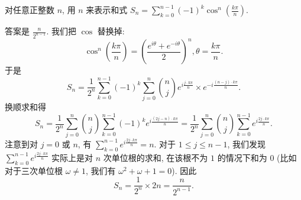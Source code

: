 \begin{prob}
\label{prob:prob-3}
对任意正整数 $n$, 用 $n$ 来表示和式
$S_n = \sum_{k=0}^{n-1}(-1)^k\cos^n(\frac{k\pi}{n})$.
\end{prob}

\begin{soln}
答案是 $\boxed{\tfrac{n}{2^{n-1}}.}$
我们把 $\cos$ 替换掉:
\[
\cos^n\left(\frac{k\pi}{n}\right) =
\left(\frac{e^{i\theta} + e^{-i\theta}}{2}\right)^n,
\theta = \frac{k\pi}{n}.
\]
于是
\[
S_n = \frac{1}{2^n}\sum_{k=0}^{n-1}(-1)^k \sum_{j=0}^n \binom{n}{j}
e^{i\frac{j\cdot k\pi}{n}} \times e^{-i\frac{(n-j)\cdot k\pi}{n}}.
\]
换顺求和得
\[
S_n = \frac{1}{2^n}\sum_{j=0}^n \binom{n}{j}\sum_{k=0}^{n-1}
(-1)^k e^{i\frac{(2j - n)\cdot k\pi}{n}} = \frac{1}{2^n}
\sum_{j=0}^n \binom{n}{j}\sum_{k=0}^{n-1} e^{i\frac{2j\cdot k\pi}{n}}.
\]
注意到对 $j = 0$ 或 $n$, 有 $\sum_{k=0}^{n-1}e^{i\frac{2j\cdot k\pi}{n}} = n$.
对于 $1 \le j \le n - 1$, 我们发现 $\sum_{k=0}^{n-1}e^{i\frac{2j\cdot k\pi}{n}}$
实际上是对 $n$ 次单位根的求和, 在该根不为 $1$ 的情况下和为 $0$
(比如对于三次单位根 $\omega \ne 1$, 我们有 $\omega^2 + \omega + 1 = 0$).
因此
\[
S_n = \frac{1}{2^n}\times 2n = \frac{n}{2^{n-1}}.
\]
\end{soln}
